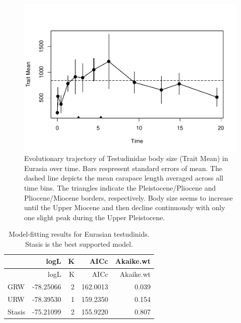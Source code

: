 \begin{figure}[H]
	\centering
	\includegraphics{MA_JJ_files/figure-latex/paleoTSEurasia-1.pdf}
	\caption[PaleoTS plot of Eurasian \T]{Evolutionary trajectory of Testudinidae body size (Trait Mean) in Eurasia over time. Bars respresent standard errors of mean. The dashed line depicts the mean carapace length averaged across all time bins. The triangles indicate the Pleistocene/Pliocene and Pliocene/Miocene borders, respectively. Body size seems to increase until the Upper Miocene and then decline continuously with only one slight peak during the Upper Pleistocene.}
	\label{fig:pTSEus}
\end{figure}

\begin{longtable}[]{@{}lrrrr@{}}
	\caption[Model fits for Eurasian \T]{Model-fitting results for Eurasian testudinids. Stasis is the best supported model.}
	\label{tab:pTSEsEM}\tabularnewline
	\toprule
	& logL & K & AICc & Akaike.wt\tabularnewline
	\midrule
	\endfirsthead
	\toprule
	& logL & K & AICc & Akaike.wt\tabularnewline
	\midrule
	\endhead
	GRW & -78.25066 & 2 & 162.0013 & 0.039\tabularnewline
	URW & -78.39530 & 1 & 159.2350 & 0.154\tabularnewline
	Stasis & -75.21099 & 2 & 155.9220 & 0.807\tabularnewline
	\bottomrule
\end{longtable}



\FloatBarrier

